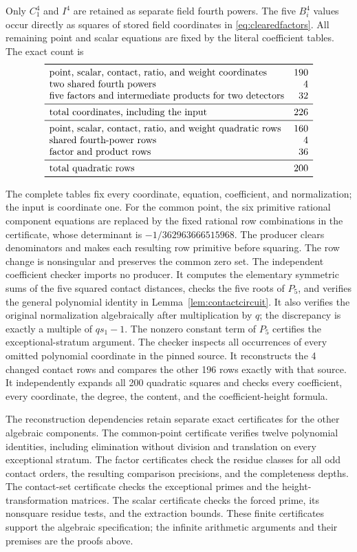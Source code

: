 \documentclass[11pt,a4paper]{article}
\begin{document}
Only $C_1^4$ and $I^4$ are retained as separate field fourth powers.
The five $B_i^4$ values occur directly as squares of stored field
coordinates in \eqref{eq:clearedfactors}. All remaining point and
scalar equations are fixed by the literal coefficient tables.
The exact count is
\[
\begin{array}{lr}\toprule
\text{point, scalar, contact, ratio, and weight coordinates}&190\\
\text{two shared fourth powers}&4\\
\text{five factors and intermediate products for two detectors}&32\\\midrule
\text{total coordinates, including the input}&226\\\midrule
\text{point, scalar, contact, ratio, and weight quadratic rows}&160\\
\text{shared fourth-power rows}&4\\
\text{factor and product rows}&36\\\midrule
\text{total quadratic rows}&200\\\bottomrule
\end{array}
\]

The complete tables fix every coordinate, equation, coefficient, and
normalization; the input is coordinate one. For the common point,
the six primitive rational component equations are replaced by the
fixed rational row combinations in the certificate, whose determinant
is $-1/362963666515968$. The producer clears denominators and makes
each resulting row primitive before squaring. The row change is
nonsingular and preserves the common zero set.
The independent coefficient checker imports no producer. It computes
the elementary symmetric sums of the five squared contact distances,
checks the five roots of $P_5$, and verifies the general polynomial
identity in Lemma~\ref{lem:contactcircuit}. It also verifies the
original normalization algebraically after multiplication by $q$;
the discrepancy is exactly a multiple of $qs_1-1$. The nonzero
constant term of $P_5$ certifies the exceptional-stratum argument.
The checker inspects all occurrences of every omitted polynomial
coordinate in the pinned source. It reconstructs the 4 changed
contact rows and compares the other 196 rows exactly with that
source. It independently expands all 200 quadratic squares and
checks every coefficient, every coordinate, the degree, the content,
and the coefficient-height formula.

The reconstruction dependencies retain separate exact certificates
for the other algebraic components. The common-point certificate
verifies twelve polynomial identities, including elimination without
division and translation on every exceptional stratum. The factor
certificates check the residue classes for all odd contact orders,
the resulting comparison precisions, and the completeness depths.
The contact-set certificate checks the exceptional primes and the
height-transformation matrices. The scalar certificate checks the
forced prime, its nonsquare residue tests, and the extraction bounds.
These finite certificates support the algebraic specification; the
infinite arithmetic arguments and their premises are the proofs above.
\end{document}
